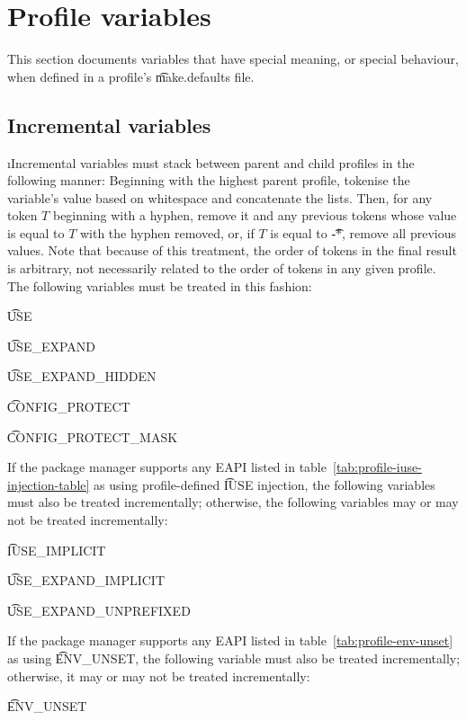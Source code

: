 \section{Profile variables}
\label{sec:profile-variables}

This section documents variables that have special meaning, or special behaviour, when defined in a
profile's \t{make.defaults} file.

\subsection{Incremental variables}
\i{Incremental} variables must stack between parent and child profiles in the following manner:
Beginning with the highest parent profile, tokenise the variable's value based on whitespace and
concatenate the lists. Then, for any token $T$ beginning with a hyphen, remove it and any previous
tokens whose value is equal to $T$ with the hyphen removed, or, if $T$ is equal to \t{-*}, remove
all previous values. Note that because of this treatment, the order of tokens in the final result is
arbitrary, not necessarily related to the order of tokens in any given profile. The following
variables must be treated in this fashion:
\begin{compactitem}
\item \t{USE}
\item \t{USE_EXPAND}
\item \t{USE_EXPAND_HIDDEN}
\item \t{CONFIG_PROTECT}
\item \t{CONFIG_PROTECT_MASK}
\end{compactitem}

If the package manager supports any EAPI listed in table~\ref{tab:profile-iuse-injection-table} as
using profile-defined \t{IUSE} injection, the following variables must also be treated
incrementally; otherwise, the following variables may or may not be treated incrementally:
\begin{compactitem}
\item \t{IUSE_IMPLICIT}
\item \t{USE_EXPAND_IMPLICIT}
\item \t{USE_EXPAND_UNPREFIXED}
\end{compactitem}

If the package manager supports any EAPI listed in table~\ref{tab:profile-env-unset} as using
\t{ENV_UNSET}, the following variable must also be treated incrementally; otherwise, it may or
may not be treated incrementally:
\begin{compactitem}
\item \t{ENV_UNSET}
\end{compactitem}

